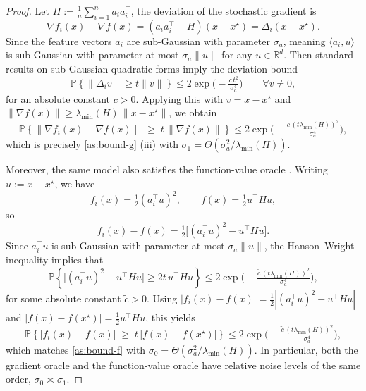\documentclass{article}
\theoremstyle{definition}
\newcommand{\assign}{:=}
\begin{document}
\begin{proof}
  Let $H \assign \tfrac1n \sum_{i=1}^n a_i a_i^\top$, the deviation of the stochastic gradient is
\[
    \nabla f_i(x) - \nabla f(x)
    = (a_i a_i^\top - H)(x - x^\star)
    = \Delta_i (x - x^\star).
\]
Since the feature vectors $a_i$ are sub-Gaussian with parameter $\sigma_a$, meaning
$\langle a_i, u \rangle$ is sub-Gaussian with parameter at most $\sigma_a\|u\|$ for
any $u \in \mathbb{R}^d$.  Then standard results on sub-Gaussian quadratic
forms \cite{vershynin2018high} imply the deviation bound
\[
    \mathbb{P}\!\left\{ \|\Delta_i v\| \ge t \|v\| \right\}
    \le
    2 \exp\!\big( -\tfrac{c\,t^{2}}{\sigma_a^{4}} \big)
    \qquad\forall v \neq 0,
\]
for an absolute constant $c>0$.  Applying this with $v = x - x^\star$ and
$\|\nabla f(x)\| \ge \lambda_{\min}(H)\,\|x - x^\star\|$, we obtain
\[
    \mathbb{P}\!\left\{
        \|\nabla f_i(x) - \nabla f(x)\|
        \;\ge\;
        t \, \|\nabla f(x)\|
    \right\}
    \le
    2 \exp\!\big(
        -\tfrac{c\,(t \lambda_{\min}(H))^{2}}{\sigma_a^{4}}
    \big),
\]
which is precisely \cref{as:bound-g} (iii) with $\sigma_1 = \Theta(\sigma_a^{2}/\lambda_{\min}(H))$.


Moreover, the same model also satisfies the function-value oracle
. Writing $u \assign x - x^\star$, we have
\[
    f_i(x) = \tfrac12 (a_i^\top u)^2,
    \qquad
    f(x)   = \tfrac12 u^\top H u,
\]
so
\[
    f_i(x) - f(x)
    = \tfrac12\big[(a_i^\top u)^2 - u^\top H u\big].
\]
Since $a_i^\top u$ is sub-Gaussian with parameter at most
$\sigma_a\|u\|$, the Hanson--Wright inequality
\cite{vershynin2018high} implies that
\[
    \mathbb{P}\!\left\{
        \big|(a_i^\top u)^2 - u^\top H u\big|
        \ge 2 t \, u^\top H u
    \right\}
    \le
    2 \exp\!\big(
        -\tfrac{\tilde c\,(t \lambda_{\min}(H))^{2}}{\sigma_a^{4}}
    \big),
\]
for some absolute constant $\tilde c>0$.  Using
$|f_i(x) - f(x)| = \tfrac12 |(a_i^\top u)^2 - u^\top H u|$ and
$|f(x)-f(x^\star)| = \tfrac12 u^\top H u$, this yields
\[
    \mathbb{P}\!\left\{
        |f_i(x) - f(x)|
        \;\ge\;
        t \, |f(x) - f(x^\star)|
    \right\}
    \le
    2 \exp\!\big(
        -\tfrac{\tilde c\,(t \lambda_{\min}(H))^{2}}{\sigma_a^{4}}
    \big),
\]
which matches \cref{as:bound-f} with
$\sigma_0 = \Theta(\sigma_a^{2}/\lambda_{\min}(H))$.  In particular,
both the gradient oracle and the function-value oracle have relative
noise levels of the same order, $\sigma_0 \asymp \sigma_1$.
\end{proof}
\end{document}
